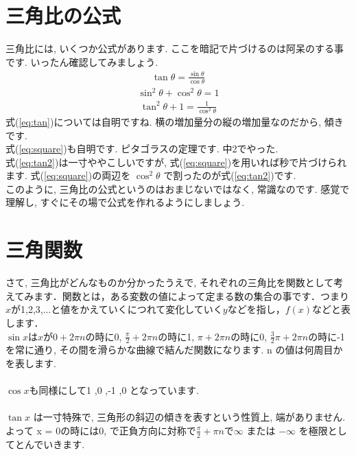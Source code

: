 \documentclass[11pt,a4paper,uplatex]{ujreport}
\begin{document}
\section{三角比の公式}
三角比には, いくつか公式があります. ここを暗記で片づけるのは阿呆のする事です. いったん確認してみましょう.
\begin{eqnarray}
\tan \theta = \frac{\sin\theta}{\cos\theta}
\label{eq:tan}
\end{eqnarray}
\begin{eqnarray}
\sin^2 \theta + \cos^2\theta = 1
\label{eq:square}
\end{eqnarray}
\begin{eqnarray}
\tan^2\theta + 1 = \frac{1}{\cos^2\theta}
\label{eq:tan2}
\end{eqnarray}
式(\ref{eq:tan})については自明ですね. 横の増加量分の縦の増加量なのだから, 傾きです.\\

式(\ref{eq:square})も自明です. ピタゴラスの定理です. 中2でやった. \\

式(\ref{eq:tan2})は一寸ややこしいですが, 式(\ref{eq:square})を用いれば秒で片づけられます. 式(\ref{eq:square})の両辺を $\cos^2\theta$ で割ったのが式(\ref{eq:tan2})です.\\

このように, 三角比の公式というのはおまじないではなく, 常識なのです. 感覚で理解し, すぐにその場で公式を作れるようにしましょう. 


\section{三角関数}
さて, 三角比がどんなものか分かったうえで, それぞれの三角比を関数として考えてみます．関数とは，ある変数の値によって定まる数の集合の事です．つまり$x$が1,2,3,...と値をかえていくにつれて変化していく$y$などを指し，$f(x)$などと表します．\\

 $\sin x $は$x$が$0 + 2\pi n$の時に0, $\frac{\pi}{2} + 2\pi n$の時に1, $\pi + 2\pi n$の時に0, $\frac{3}{2}\pi + 2\pi n$の時に-1を常に通り, その間を滑らかな曲線で結んだ関数になります. n の値は何周目かを表します.\\
\\
$\cos x $も同様にして1 ,0 ,-1 ,0 となっています. \\
\\
$\tan x$ は一寸特殊で, 三角形の斜辺の傾きを表すという性質上, 端がありません. よって x = 0の時には0, で正負方向に対称で$\frac{\pi}{2} + \pi n$で$\infty$ または $-\infty$ を極限としてとんでいきます.\\
\end{document}
